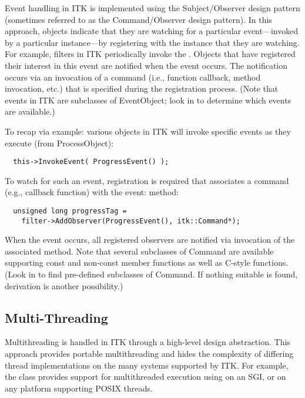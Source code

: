 
Event handling in ITK is implemented using the Subject/Observer design
pattern \cite{Gamma1995} (sometimes referred to as the Command/Observer
design pattern). In this approach, objects indicate that they are watching
for a particular event---invoked by a particular instance---by registering
with the instance that they are watching.  For example, filters in ITK
periodically invoke the . Objects that have registered
their interest in this event are notified when the event occurs. The
notification occurs via an invocation of a command (i.e., function callback,
method invocation, etc.) that is specified during the registration
process. (Note that events in ITK are subclasses of EventObject; look
in  to determine which events are available.)

To recap via example: various objects in ITK will invoke specific events
as they execute (from ProcessObject):
\small
\begin{verbatim}
  this->InvokeEvent( ProgressEvent() );
\end{verbatim}
\normalsize

To watch for such an event, registration is required that associates a
command (e.g., callback function) with the event:
 method:
\small
\begin{verbatim}
  unsigned long progressTag =
    filter->AddObserver(ProgressEvent(), itk::Command*);
\end{verbatim}
\normalsize

When the event occurs, all registered observers are notified via invocation
of the associated  method. Note that several
subclasses of Command are available supporting const and
non-const member functions as well as C-style functions. (Look in
 to find pre-defined subclasses of
Command. If nothing suitable is found, derivation is another
possibility.)

\subsection{Multi-Threading}
\label{sec:MultiThreading}

Multithreading is handled in ITK through a high-level design
abstraction. This approach provides portable multithreading and hides the
complexity of differing thread implementations on the many systems supported
by ITK. For example, the class  provides support for
multithreaded execution using  on an SGI, or
 on any platform supporting POSIX threads.


